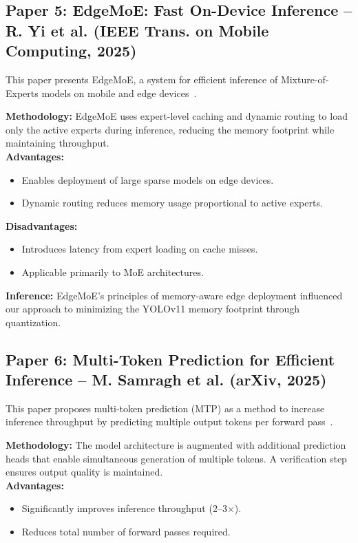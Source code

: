 \documentclass[11pt]{report}
\begin{document}
\subsection{Paper 5: EdgeMoE: Fast On-Device Inference -- R. Yi et al. (IEEE Trans. on Mobile Computing, 2025)}
This paper presents EdgeMoE, a system for efficient inference of Mixture-of-Experts models on mobile and edge devices~\cite{yi2025}. \par

\textbf{Methodology:} EdgeMoE uses expert-level caching and dynamic routing to load only the active experts during inference, reducing the memory footprint while maintaining throughput. \\

\textbf{Advantages:}
\begin{itemize}
    \item Enables deployment of large sparse models on edge devices.
    \item Dynamic routing reduces memory usage proportional to active experts.
\end{itemize}

\textbf{Disadvantages:}
\begin{itemize}
    \item Introduces latency from expert loading on cache misses.
    \item Applicable primarily to MoE architectures.
\end{itemize}

\textbf{Inference:}
EdgeMoE's principles of memory-aware edge deployment influenced our approach to minimizing the YOLOv11 memory footprint through quantization.

\subsection{Paper 6: Multi-Token Prediction for Efficient Inference -- M. Samragh et al. (arXiv, 2025)}
This paper proposes multi-token prediction (MTP) as a method to increase inference throughput by predicting multiple output tokens per forward pass~\cite{samragh2025}. \par

\textbf{Methodology:} The model architecture is augmented with additional prediction heads that enable simultaneous generation of multiple tokens. A verification step ensures output quality is maintained. \\

\textbf{Advantages:}
\begin{itemize}
    \item Significantly improves inference throughput (2--3$\times$).
    \item Reduces total number of forward passes required.
\end{itemize}
\end{document}
